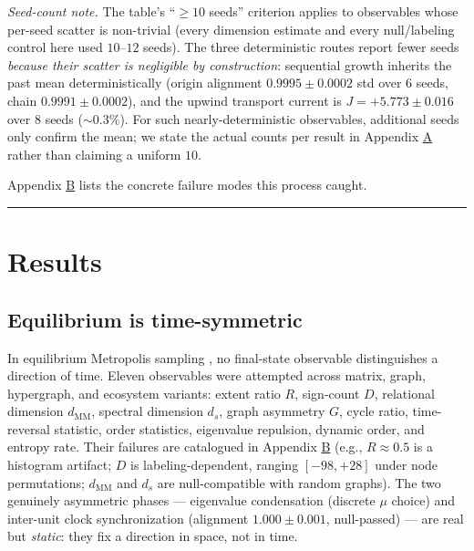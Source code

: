 \documentclass[12pt,a4paper]{article}
\begin{document}
\emph{Seed-count note.} The table's ``\(\ge 10\) seeds'' criterion
applies to observables whose per-seed scatter is non-trivial (every
dimension estimate and every null/labeling control here used
\(10\)--\(12\) seeds). The three deterministic routes report fewer seeds
\emph{because their scatter is negligible by construction}: sequential
growth inherits the past mean deterministically (origin alignment
\(0.9995\pm0.0002\) std over 6 seeds, chain \(0.9991\pm0.0002\)), and
the upwind transport current is \(J=+5.773\pm0.016\) over 8 seeds
(\(\sim0.3\%\)). For such nearly-deterministic observables, additional
seeds only confirm the mean; we state the actual counts per result in
Appendix \hyperref[appendix-a-reproducibility]{A} rather than claiming a
uniform \(10\).

Appendix \hyperref[appendix-b-trap-catalog]{B} lists the concrete
failure modes this process caught.

\begin{center}\rule{0.5\linewidth}{0.5pt}\end{center}

\section{Results}\label{results}

\subsection{Equilibrium is
time-symmetric}\label{equilibrium-is-time-symmetric}

In equilibrium Metropolis sampling \cite{metropolis_1953}, no
final-state observable distinguishes a direction of time. Eleven
observables were attempted across matrix, graph, hypergraph, and
ecosystem variants: extent ratio \(R\), sign-count \(D\), relational
dimension \(d_{\mathrm{MM}}\), spectral dimension \(d_s\), graph
asymmetry \(G\), cycle ratio, time-reversal statistic, order statistics,
eigenvalue repulsion, dynamic order, and entropy rate. Their failures
are catalogued in Appendix \hyperref[appendix-b-trap-catalog]{B} (e.g.,
\(R\approx0.5\) is a histogram artifact; \(D\) is labeling-dependent,
ranging \([-98,+28]\) under node permutations; \(d_{\mathrm{MM}}\) and
\(d_s\) are null-compatible with random graphs). The two genuinely
asymmetric phases --- eigenvalue condensation (discrete \(\mu\) choice)
and inter-unit clock synchronization (alignment \(1.000\pm0.001\),
null-passed) --- are real but \emph{static}: they fix a direction in
space, not in time.
\end{document}
